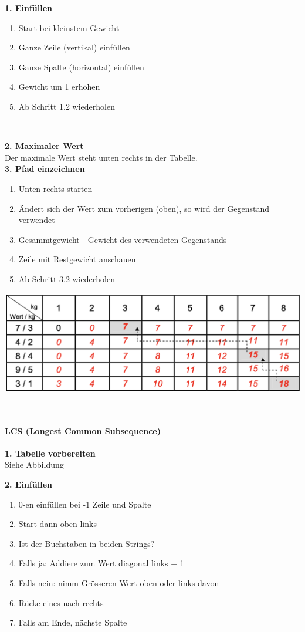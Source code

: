 \textbf{1. Einfüllen}\\
\begin{enumerate}
    \item Start bei kleinstem Gewicht
    \item Ganze Zeile (vertikal) einfüllen
    \item Ganze Spalte (horizontal) einfüllen
    \item Gewicht um 1 erhöhen
    \item Ab Schritt 1.2 wiederholen
\end{enumerate}
$ $

\textbf{2. Maximaler Wert}\\
Der maximale Wert steht unten rechts in der Tabelle.\\

\textbf{3. Pfad einzeichnen}\\
\begin{enumerate}
    \item Unten rechts starten
    \item Ändert sich der Wert zum vorherigen (oben), so wird der Gegenstand verwendet
    \item Gesammtgewicht - Gewicht des verwendeten Gegenstands
    \item Zeile mit Restgewicht anschauen
    \item Ab Schritt 3.2 wiederholen
\end{enumerate}
\begin{center}
    \includegraphics[scale=0.25]{graphic/10 DynamicProgramming/pfad.png}
\end{center}


\vfill
$ $
\columnbreak
\paragraph{LCS (Longest Common Subsequence)}

\textbf{1. Tabelle vorbereiten}\\
Siehe Abbildung

\textbf{2. Einfüllen}\\
\begin{enumerate}
    \item 0-en einfüllen bei -1 Zeile und Spalte
    \item Start dann oben links
    \item Ist der Buchstaben in beiden Strings?
    \item Falls ja: Addiere zum Wert diagonal links + 1
    \item Falls nein: nimm Grösseren Wert oben oder links davon
    \item Rücke eines nach rechts
    \item Falls am Ende, nächste Spalte
\end{enumerate}
$ $

